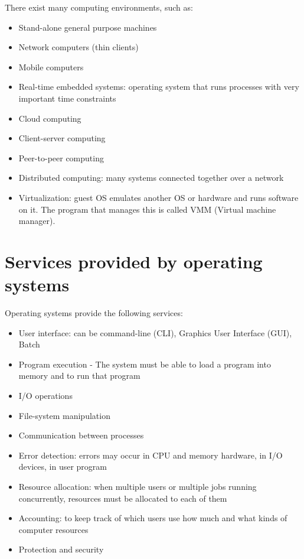 There exist many computing environments, such as:
\begin{itemize}
  \item Stand-alone general purpose machines
  \item Network computers (thin clients)
  \item Mobile computers
  \item Real-time embedded systems: operating system that runs processes with
  very important time constraints
  \item Cloud computing
  \item Client-server computing
  \item Peer-to-peer computing
  \item Distributed computing: many systems connected together over a network
  \item Virtualization: guest OS emulates another OS or hardware and runs
  software on it. The program that manages this is called VMM (Virtual machine
  manager).
\end{itemize}

\section{Services provided by operating systems}

Operating systems provide the following services:
\begin{itemize}
  \item User interface: can be command-line (CLI), Graphics User Interface
  (GUI), Batch
  \item Program execution - The system must be able to load a program into
  memory and to run that program
  \item I/O operations
  \item File-system manipulation
  \item Communication between processes
  \item Error detection: errors may occur in CPU and memory hardware, in I/O
  devices, in user program
  \item Resource allocation: when multiple users or multiple jobs running
  concurrently, resources must be allocated to each of them
  \item Accounting: to keep track of which users use how much and what kinds
  of computer resources
  \item Protection and security
\end{itemize}

